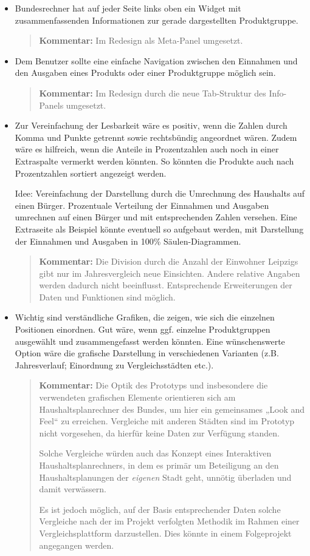 \documentclass[11pt,a4paper,twoside]{article}
\newcommand{\kommentar}[1]{\begin{quote}\textbf{Kommentar:} #1 \end{quote}}
\begin{document}
\begin{itemize}\itemsep0pt
\item Bundesrechner hat auf jeder Seite links oben ein Widget mit
  zusammenfassenden Informationen zur gerade dargestellten Produktgruppe.

  \kommentar{Im Redesign als Meta-Panel umgesetzt. }
\item Dem Benutzer sollte eine einfache Navigation zwischen den Einnahmen und
  den Ausgaben eines Produkts oder einer Produktgruppe möglich sein.

  \kommentar{Im Redesign durch die neue Tab-Struktur des Info-Panels
    umgesetzt.}
\item Zur Vereinfachung der Lesbarkeit wäre es positiv, wenn die Zahlen durch
  Komma und Punkte getrennt sowie rechtsbündig angeordnet wären. Zudem wäre es
  hilfreich, wenn die Anteile in Prozentzahlen auch noch in einer Extraspalte
  vermerkt werden könnten.  So könnten die Produkte auch nach Prozentzahlen
  sortiert angezeigt werden.

  Idee: Vereinfachung der Darstellung durch die Umrechnung des Haushalts
  auf einen Bürger.  Prozentuale Verteilung der Einnahmen und Ausgaben
  umrechnen auf einen Bürger und mit entsprechenden Zahlen versehen. Eine
  Extraseite als Beispiel könnte eventuell so aufgebaut werden, mit
  Darstellung der Einnahmen und Ausgaben in 100\% Säulen-Diagrammen.

  \kommentar{Die Division durch die Anzahl der Einwohner Leipzigs gibt nur im
    Jahresvergleich neue Einsichten.  Andere relative Angaben werden dadurch
    nicht beeinflusst.  Entsprechende Erweiterungen der Daten und Funktionen
    sind möglich. }

\item Wichtig sind verständliche Grafiken, die zeigen, wie sich die einzelnen
  Positionen einordnen. Gut wäre, wenn ggf. einzelne Produktgruppen ausgewählt
  und zusammengefasst werden könnten. Eine wünschenswerte Option wäre die
  grafische Darstellung in verschiedenen Varianten (z.B. Jahresverlauf;
  Einordnung zu Vergleichsstädten etc.).

\kommentar{Die Optik des Prototyps und insbesondere die verwendeten grafischen
  Elemente orientieren sich am Haushaltsplanrechner des Bundes, um hier ein
  gemeinsames „Look and Feel“ zu erreichen.  Vergleiche mit anderen Städten 
  sind im Prototyp nicht vorgesehen, da hierfür keine Daten zur Verfügung
  standen.  

  Solche Vergleiche würden auch das Konzept eines Interaktiven
  Haushaltsplanrechners, in dem es primär um Beteiligung an den
  Haushaltsplanungen der \emph{eigenen} Stadt geht, unnötig überladen und
  damit verwässern.

  Es ist jedoch möglich, auf der Basis entsprechender Daten solche Vergleiche
  nach der im Projekt verfolgten Methodik im Rahmen einer Vergleichsplattform
  darzustellen.  Dies könnte in einem Folgeprojekt angegangen werden.} 
\end{itemize}
\end{document}
